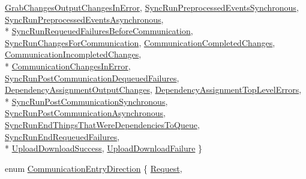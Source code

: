 \begin{DoxyCompactItemize}
\hyperlink{namespace_cloud_api_public_1_1_static_a9082ca8fb56ff22723a53cd835e02451}{Grab\-Changes\-Output\-Changes\-In\-Error}, 
\hyperlink{namespace_cloud_api_public_1_1_static_a9082ca8fb56ff22723a53cd835e02451}{Sync\-Run\-Preprocessed\-Events\-Synchronous}, 
\hyperlink{namespace_cloud_api_public_1_1_static_a9082ca8fb56ff22723a53cd835e02451}{Sync\-Run\-Preprocessed\-Events\-Asynchronous}, 
\\*
\hyperlink{namespace_cloud_api_public_1_1_static_a9082ca8fb56ff22723a53cd835e02451}{Sync\-Run\-Requeued\-Failures\-Before\-Communication}, 
\hyperlink{namespace_cloud_api_public_1_1_static_a9082ca8fb56ff22723a53cd835e02451}{Sync\-Run\-Changes\-For\-Communication}, 
\hyperlink{namespace_cloud_api_public_1_1_static_a9082ca8fb56ff22723a53cd835e02451}{Communication\-Completed\-Changes}, 
\hyperlink{namespace_cloud_api_public_1_1_static_a9082ca8fb56ff22723a53cd835e02451}{Communication\-Incompleted\-Changes}, 
\\*
\hyperlink{namespace_cloud_api_public_1_1_static_a9082ca8fb56ff22723a53cd835e02451}{Communication\-Changes\-In\-Error}, 
\hyperlink{namespace_cloud_api_public_1_1_static_a9082ca8fb56ff22723a53cd835e02451}{Sync\-Run\-Post\-Communication\-Dequeued\-Failures}, 
\hyperlink{namespace_cloud_api_public_1_1_static_a9082ca8fb56ff22723a53cd835e02451}{Dependency\-Assignment\-Output\-Changes}, 
\hyperlink{namespace_cloud_api_public_1_1_static_a9082ca8fb56ff22723a53cd835e02451}{Dependency\-Assignment\-Top\-Level\-Errors}, 
\\*
\hyperlink{namespace_cloud_api_public_1_1_static_a9082ca8fb56ff22723a53cd835e02451}{Sync\-Run\-Post\-Communication\-Synchronous}, 
\hyperlink{namespace_cloud_api_public_1_1_static_a9082ca8fb56ff22723a53cd835e02451}{Sync\-Run\-Post\-Communication\-Asynchronous}, 
\hyperlink{namespace_cloud_api_public_1_1_static_a9082ca8fb56ff22723a53cd835e02451}{Sync\-Run\-End\-Things\-That\-Were\-Dependencies\-To\-Queue}, 
\hyperlink{namespace_cloud_api_public_1_1_static_a9082ca8fb56ff22723a53cd835e02451}{Sync\-Run\-End\-Requeued\-Failures}, 
\\*
\hyperlink{namespace_cloud_api_public_1_1_static_a9082ca8fb56ff22723a53cd835e02451}{Upload\-Download\-Success}, 
\hyperlink{namespace_cloud_api_public_1_1_static_a9082ca8fb56ff22723a53cd835e02451}{Upload\-Download\-Failure}
 \}
\begin{DoxyCompactList}\small\item\em \end{DoxyCompactList}\item 
enum \hyperlink{namespace_cloud_api_public_1_1_static_a5c3e1c9c171c6fc2d14d98e753f33c72}{Communication\-Entry\-Direction} \{ \hyperlink{namespace_cloud_api_public_1_1_static_a5c3e1c9c171c6fc2d14d98e753f33c72}{Request}, 

\end{DoxyCompactItemize}
